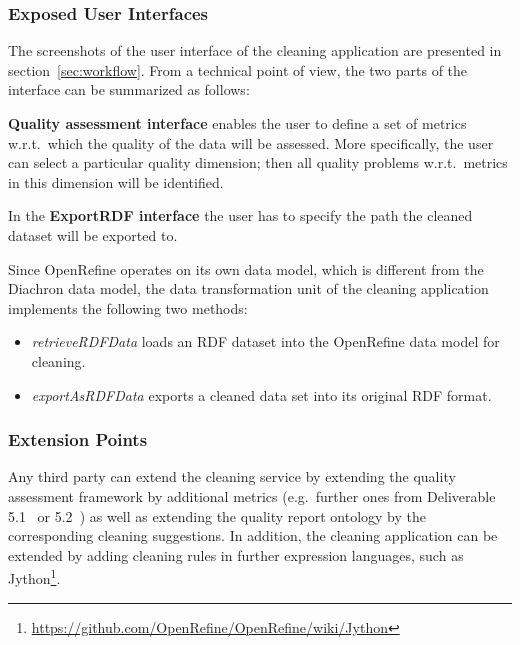 \subsubsection{Exposed User Interfaces}

The screenshots of the user interface of the cleaning application are presented in section~\ref{sec:workflow}. 
From a technical point of view, the two parts of the interface can be summarized as follows:

\textbf{Quality assessment interface} enables the user to define a set of metrics w.r.t.\ which the quality of the data will be assessed. More specifically, the user can select a particular quality dimension; then all quality problems w.r.t.\ metrics in this dimension will be identified.

In the \textbf{ExportRDF interface} the user has to specify the path the cleaned dataset will be exported to.

Since OpenRefine operates on its own data model, which is different from the Diachron data model, the data transformation unit of the cleaning application implements the following two methods: 
\begin{itemize}
\item \textit{retrieveRDFData} loads an RDF dataset into the OpenRefine data model for cleaning.
\item \textit{exportAsRDFData} exports a cleaned data set into its original RDF format.
\end{itemize}

\subsubsection{Extension Points}

Any third party can extend the cleaning service by extending the quality assessment framework by additional metrics (e.g.\ further ones from Deliverable 5.1~\cite{diachron-d5.1} or 5.2~\cite{diachron-d5.2}) as well as extending the quality report ontology by the corresponding cleaning suggestions.  In addition, the cleaning application can be extended by adding cleaning rules in further expression languages, such as Jython\footnote{\url{https://github.com/OpenRefine/OpenRefine/wiki/Jython}}.


